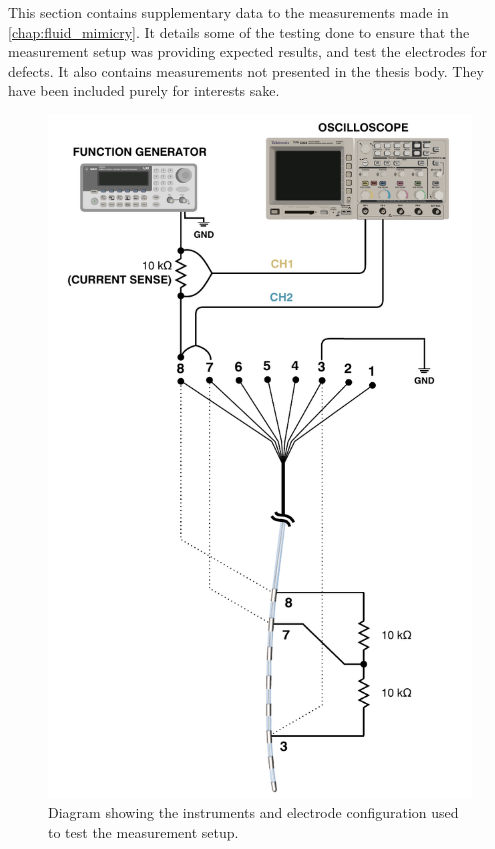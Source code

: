This section contains supplementary data to the measurements made in \cref{chap:fluid_mimicry}.
It details some of the testing done to ensure that the measurement setup was providing expected results, and test the electrodes for defects.
It also contains measurements not presented in the thesis body.
They have been included purely for interests sake.


\begin{figure}
    \centering
    \includegraphics[scale=0.95]{content/appendices/Solution-Impedance-Measurements/graphics/Solution-Impedance-Testing-Setup}
    \caption{\label{fig:solution_impedance_testing_setup}Diagram showing the instruments and electrode configuration used to test the measurement setup.}
\end{figure}

